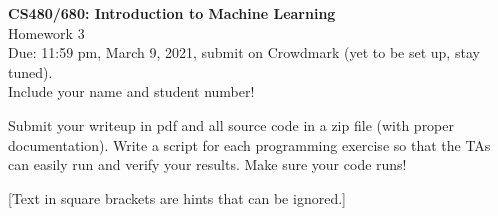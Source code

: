 \documentclass[10pt,letter,notitlepage]{article}
\newcommand{\red}[1]{{\color{red}#1}}
\newcounter{exercise}
\begin{document}
\begin{center}
  \large{\textbf{CS480/680: Introduction to Machine Learning} \\ Homework 3\\ \red{Due: 11:59 pm, March 9, 2021}, \red{submit on Crowdmark (yet to be set up, stay tuned)}.} \\

Include your name and student number!

\end{center}

\begin{center}
Submit your writeup in pdf and all source code in a zip file (with proper documentation). Write a script for each programming exercise so that the TAs can easily run and verify your results. Make sure your code runs!

[Text in square brackets are hints that can be ignored.]
\end{center}
\end{document}
